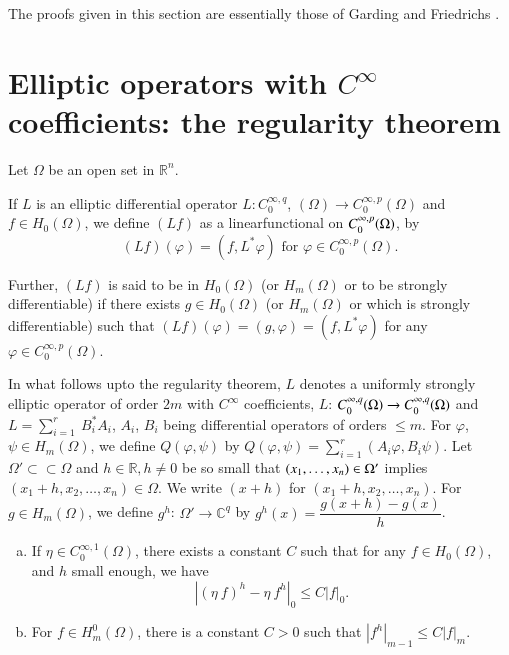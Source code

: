 The proofs given in this section are essentially those of Garding
\cite{11} and Friedrichs \cite{10}. 

\section[Elliptic operators with $C^\infty$...]{Elliptic operators
  with $C^\infty$ coefficients: the regularity theorem}\label{chap3:sec7} 

Let $\Omega$ be an open set in $\mathbb{R}^n$.
\begin{defi*}%
  If $L$ is an elliptic differential operator $L : C^{\infty,q}_0$,
  $(\Omega ) \rightarrow C^{\infty, p}_0 (\Omega )$ and $f \in H_0
  (\Omega )$, we define $(Lf)$ as a linear\pageoriginale functional on $C^{\infty,
    p}_0\break (\Omega )$, by 
  $$
  (Lf) (\varphi) = (f, L^* \varphi) \text{ for } \varphi \in
  C^{\infty,p}_0 (\Omega). 
  $$
\end{defi*}

Further, $(Lf)$ is said to be in $H_0 (\Omega)$ (or $H_m (\Omega)$ or
to be strongly differentiable) if there exists $g \in H_0 (\Omega ) $
(or $H_m(\Omega )$ or which is strongly differentiable) such that
$(Lf) (\varphi ) = (g, \varphi ) = (f, L^* \varphi )$ for any $\varphi
\in C^{\infty, p}_0 (\Omega )$. 

In what follows upto the regularity theorem, $L$ denotes a uniformly
strongly elliptic operator of order $2m$ with $C^\infty$ coefficients,
$L$: $C^{\infty, q}_0\break (\Omega ) \rightarrow C^{\infty, q}_0 (\Omega )
$ and $L = \sum\limits_{i = 1}^r ~ B^*_i A_i$, $A_i$, $B_i$ being
differential operators of orders $\leq m$. For $\varphi$, $\psi \in
H_m (\Omega )$, we define $Q(\varphi, \psi )$ by $ Q(\varphi , \psi ) =
\sum\limits_{i=1}^r (A_i \varphi, B_i \psi )$. Let $\Omega' \subset\subset
\Omega$ and $h \in \mathbb{R}, h \neq 0$ be so small that $(x_1,
\ldots,\break x_n) \in \Omega'$ implies $(x_1 + h, x_2, \ldots, x_n) \in
\Omega$. We write $(x + h)$ for $(x_1+h,x_2, \ldots, x_n)$. For $g \in H_m
(\Omega )$, we define $g^h$: $\Omega' \rightarrow \mathbb{C}^q$ by
$g^h(x) = \dfrac{g(x+h) - g(x)}{h}$. 

\setcounter{lemma}{0}
\begin{lemma}\label{chap3:sec7:lem1}%
  \begin{enumerate}[(a)]
  \item If $\eta \in  C^{\infty, 1}_0 (\Omega)$, there exists a
    constant $C$ such that for any $f \in H_0 (\Omega)$, and $h$ small
    enough, we have 
    $$
    | ( \eta ~ f )^h - \eta ~ f^h |_0 \leq C | f |_0.
    $$
  \item For $f \in H^0_m (\Omega )$, there is a constant $C > 0$ such
    that $| f^h |_{m-1} \leq C | f |_m$. 
  \end{enumerate}
\end{lemma}


